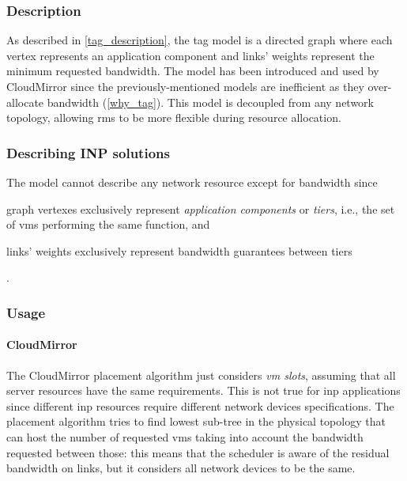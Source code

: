 
\subsubsection{Description}
As described in \autoref{tag_description}, the \gls{tag} model is a directed graph where each vertex represents an application component and links' weights represent the minimum requested bandwidth.
The model has been introduced and used by CloudMirror \cite{cloudmirror} since the previously-mentioned models are inefficient as they over-allocate bandwidth (\autoref{why_tag}).
This model is decoupled from any network topology, allowing \glspl{rm} to be more flexible during resource allocation.

\subsubsection{Describing INP solutions}
The model cannot describe any network resource except for bandwidth since
\begin{mylist}
    \item graph vertexes exclusively represent \textit{application components} or \textit{tiers}, i.e., the set of \glspl{vm} performing the same function, and
    \item links' weights exclusively represent bandwidth guarantees between tiers
\end{mylist}.

\subsubsection{Usage}
\paragraph{CloudMirror \texorpdfstring{\cite{cloudmirror}}{}}
The CloudMirror \cite{cloudmirror} placement algorithm just considers \textit{\gls{vm} slots}, assuming that all server resources have the same requirements.
This is not true for \gls{inp} applications since different \gls{inp} resources require different network devices specifications.
The placement algorithm tries to find lowest sub-tree in the physical topology that can host the number of requested \glspl{vm} taking into account the bandwidth requested between those: this means that the scheduler is aware of the residual bandwidth on links, but it considers all network devices to be the same.